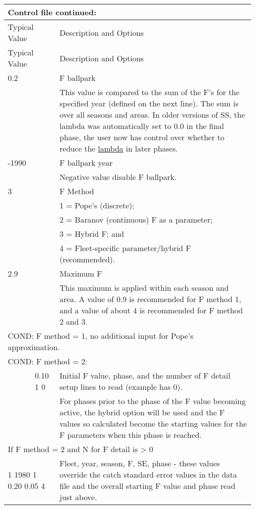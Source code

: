 \begin{longtable}{p{1cm} p{3cm} p{11cm}}
	\multicolumn{3}{l}{Control file continued:}\\
	\hline
	\multicolumn{2}{l}{Typical Value} & Description and Options\Tstrut\Bstrut\\
	\hline
	\endfirsthead

	\hline
	\multicolumn{2}{l}{Typical Value} & Description and Options\Tstrut\Bstrut\\
	\hline
	\endhead

	\hline
	\endfoot
	\endlastfoot

	0.2 \Tstrut & & F ballpark\\
	    & & This value is compared to the sum of the F's for the specified year (defined on the next line). The sum is over all seasons and areas. In older versions of SS, the lambda was automatically set to 0.0 in the final phase, the user now has control over whether to reduce the \hyperlink{Lambdas}{lambda} in later phases.\Bstrut\\
   \hline

	-1990\Tstrut & & F ballpark year\\
	      & & Negative value disable F ballpark.\Bstrut\\
   \hline

	3 \Tstrut & & F Method \\
	   & & 1 = Pope's (discrete); \\
	   & & 2 = Baranov (continuous) F as a parameter; \\
	   & & 3 = Hybrid F; and \\
	   & & 4 = Fleet-specific parameter/hybrid F (recommended).\Bstrut\\
   \hline

   2.9 \Tstrut & & Maximum F \\
       & & This maximum is applied within each season and area.   A value of 0.9 is recommended for F method 1, and a value of about 4 is recommended for F method 2 and 3. \Bstrut\\
   \hline

   \multicolumn{3}{l}{COND: F method = 1, no additional input for Pope's approximation.}\Tstrut\Bstrut\\
   \hline

   \multicolumn{3}{l}{COND: F method = 2: }\Tstrut\\
   & 0.10  1  0 & Initial F value, phase, and the number of F detail setup lines to read (example has 0). \\
   &  & For phases prior to the phase of the F value becoming active,  the hybrid option will be used and the F values so calculated become the starting values for the F parameters when this phase is reached.\\		   
   \multicolumn{3}{l}{If F method = 2 and N for F detail is > 0}\Tstrut\\
   \multicolumn{2}{l}{1 1980 1 0.20 0.05 4} & Fleet, year, season, F, SE, phase - these values override the catch standard error values in the data file and the overall starting F value and phase read just above.\Bstrut\\
   \hline


\end{longtable}
